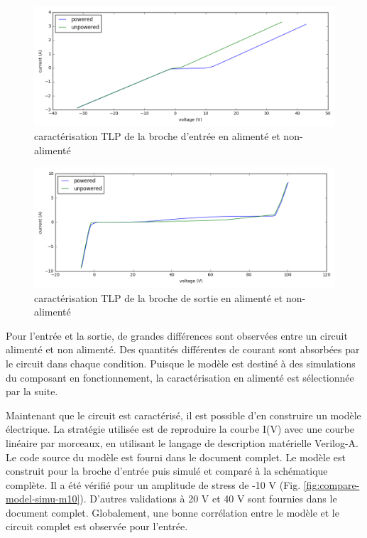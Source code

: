 \begin{figure}[!h]
  \centering
  \includegraphics[width=\textwidth]{src/1/figures/tlp_input_characterization.png}
  \caption{caractérisation TLP de la broche d'entrée en alimenté et non-alimenté}
  \label{fig:tlp-input-cz}
\end{figure}

\begin{figure}[!h]
  \centering
  \includegraphics[width=\textwidth]{src/1/figures/tlp_output_characterization.png}
  \caption{caractérisation TLP de la broche de sortie en alimenté et non-alimenté}
  \label{fig:tlp-output-cz}
\end{figure}

Pour l'entrée et la sortie, de grandes différences sont observées entre un circuit alimenté et non alimenté.
Des quantités différentes de courant sont absorbées par le circuit dans chaque condition.
Puisque le modèle est destiné à des simulations du composant en fonctionnement, la caractérisation en alimenté est sélectionnée par la suite.

Maintenant que le circuit est caractérisé, il est possible d'en construire un modèle électrique.
La stratégie utilisée est de reproduire la courbe I(V) avec une courbe linéaire par morceaux, en utilisant le langage de description matérielle Verilog-A.
Le code source du modèle est fourni dans le document complet.
Le modèle est construit pour la broche d'entrée puis simulé et comparé à la schématique complète.
Il a été vérifié pour un amplitude de stress de -10 V (Fig. \ref{fig:compare-model-simu-m10}).
D'autres validations à 20 V et 40 V sont fournies dans le document complet.
Globalement, une bonne corrélation entre le modèle et le circuit complet est observée pour l'entrée.

